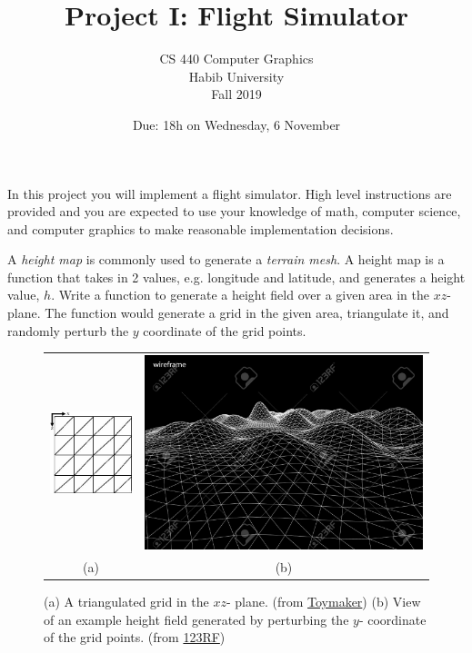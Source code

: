 \documentclass[addpoints]{exam}
\title{Project I: Flight Simulator}
\author{CS 440 Computer Graphics\\Habib University\\Fall 2019}
\date{Due: 18h on Wednesday, 6 November}
\begin{document}
\maketitle
\thispagestyle{empty}

In this project you will implement a flight simulator. High level instructions are provided and you are expected to use your knowledge of math, computer science, and computer graphics to make reasonable implementation decisions.

\begin{questions}


  A \textit{height map} is commonly used to generate a \textit{terrain mesh}. A height map is a function that takes in 2 values, e.g. longitude and latitude, and generates a height value, $h$. Write a function to generate a height field over a given area in the $xz$- plane. The function would generate a grid in the given area, triangulate it, and randomly perturb the $y$ coordinate of the grid points.
  \begin{figure}[!h]
    \centering
    \begin{tabular}{cc}
      \includegraphics[height=.35\textwidth]{terrain1}
      & \includegraphics[height=.35\textwidth]{terrain2}\\
      (a) & (b)
    \end{tabular}
    \caption{(a) A triangulated grid in the $xz$- plane. (from \href{http://keithditch.powweb.com/Games/XNA/html/xna\_terrain.html}{Toymaker}) (b) View of an example height field generated by perturbing the $y$- coordinate of the grid points. (from \href{https://www.123rf.com/photo_54102307_stock-vector-3d-wireframe-terrain-contour-vector.html}{123RF})}
  \end{figure}


\end{questions}
\end{document}
